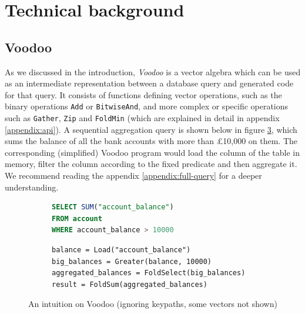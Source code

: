 \section{Technical background}
\label{section:tech}

\subsection{Voodoo}\label{original-voodoo-impl}

As we discussed in the introduction, \emph{Voodoo} \cite{Pirk:2016:VVA:3007328.3007336} is a vector algebra which can be used as an intermediate representation between a database query and generated code for that query. It consists of functions defining vector operations, such as the binary operations \texttt{Add} or \texttt{BitwiseAnd}, and more complex or specific operations such as \texttt{Gather}, \texttt{Zip} and \texttt{FoldMin} (which are explained in detail in appendix \ref{appendix:api}). A sequential aggregation query is shown below in figure \ref{fig:short-query}, which sums the balance of all the bank accounts with more than £10,000 on them. The corresponding (simplified) Voodoo program would load the column of the table in memory, filter the column according to the fixed predicate and then aggregate it. We recommend reading the appendix \ref{appendix:full-query} for a deeper understanding.

\begin{figure}[h]
    \centering
\begin{subfigure}[h]{0.39\textwidth}
    \centering
\begin{lstlisting}[language=SQL]
SELECT SUM("account_balance")
FROM account
WHERE account_balance > 10000
\end{lstlisting}
    \label{fig:short-query-sql}
\end{subfigure}
\begin{subfigure}[h]{0.59\textwidth}
    \centering
\begin{lstlisting}
balance = Load("account_balance")
big_balances = Greater(balance, 10000)
aggregated_balances = FoldSelect(big_balances)
result = FoldSum(aggregated_balances)
\end{lstlisting}
    \label{fig:short-query-vdl}
\end{subfigure}
    \caption{An intuition on Voodoo (ignoring keypaths, some vectors not shown)}
    \label{fig:short-query}
\end{figure}

